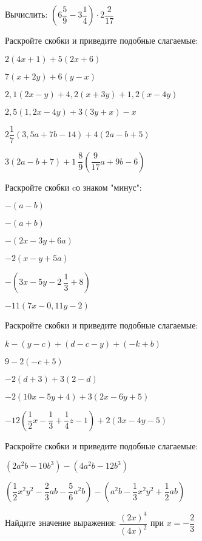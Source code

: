 \begin{class}[type=class, number=1]
	\begin{listofex}
		\item Вычислить: \( \left( 6\dfrac{5}{9}-3\dfrac{1}{4} \right)\cdot2\dfrac{2}{17} \)
		\item Раскройте скобки и приведите подобные слагаемые:
		\begin{enumcols}[itemcolumns=2]
			\item \( 2(4x+1)+5(2x+6) \)
			\item \( 7(x+2y)+6(y-x) \)
			\item \( 2,1(2x-y)+4,2(x+3y)+1,2(x-4y) \)
			\item \( 2,5(1,2x-4y)+3(3y+x)-x\)
			\item \( 2\dfrac{1}{7}(3,5a+7b-14)+4(2a-b+5) \)
			\item \( 3(2a-b+7)+1\:\dfrac{8}{9}\left( \dfrac{9}{17}a+9b-6 \right) \)
		\end{enumcols}
		\item Раскройте скобки cо знаком "минус":
		\begin{enumcols}[itemcolumns=3]
			\item \( -(a-b) \)
			\item \( -(a+b) \)
			\item \( -(2x-3y+6a) \)
			\item \( -2(x-y+5a) \)
			\item \( -\left( 3x-5y-2\:\dfrac{1}{3}+8 \right) \)
			\item \( -11(7x-0,11y-2) \)
		\end{enumcols}
		\item Раскройте скобки и приведите подобные слагаемые:
		\begin{enumcols}[itemcolumns=2]
			\item \( k-(y-c)+(d-c-y)+(-k+b) \)
			\item \( 9-2(-c+5) \)
			\item \( -2(d+3)+3(2-d) \)
			\item \( -2(10x-5y+4)+3(2x-6y+5) \)
			\item \( -12\left( \dfrac{1}{2}x-\dfrac{1}{3}+\dfrac{1}{4}z-1 \right)+2(3x-4y-5) \)
		\end{enumcols}
		\item Раскройте скобки и приведите подобные слагаемые:
		\begin{enumcols}[itemcolumns=2]
			\item \( (2a^2b-10b^3)-(4a^2b-12b^3) \)
			\item \( \left( \dfrac{1}{2}x^2y^2-\dfrac{2}{3}ab-\dfrac{5}{6}a^2b \right)-\left( a^2b-\dfrac{1}{3}x^2y^2+\dfrac{1}{2}ab \right) \)
		\end{enumcols}
		\item Найдите значение выражения: \( \dfrac{(2x)^4}{(4x)^2} \) при \( x=-\dfrac{2}{3} \)
	\end{listofex}
\end{class}
